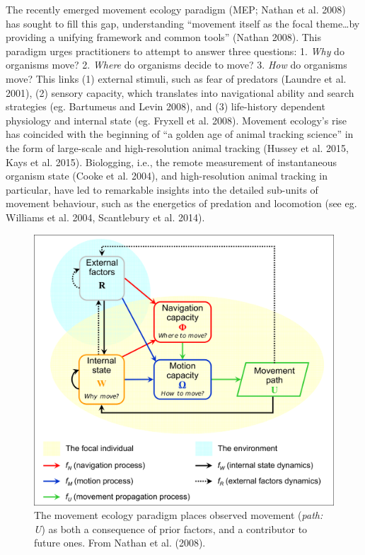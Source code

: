\documentclass[]{scrartcl}
\begin{document}
\begin{linenumbers}
The recently emerged movement ecology paradigm (MEP; Nathan et al. 2008)
has sought to fill this gap, understanding ``movement itself as the
focal theme\ldots{}by providing a unifying framework and common tools''
(Nathan 2008). This paradigm urges practitioners to attempt to answer
three questions: 1. \emph{Why} do organisms move? 2. \emph{Where} do
organisms decide to move? 3. \emph{How} do organisms move? This links
(1) external stimuli, such as fear of predators (Laundre et al. 2001),
(2) sensory capacity, which translates into navigational ability and
search strategies (eg. Bartumeus and Levin 2008), and (3) life-history
dependent physiology and internal state (eg. Fryxell et al. 2008).
Movement ecology's rise has coincided with the beginning of ``a golden
age of animal tracking science'' in the form of large-scale and
high-resolution animal tracking (Hussey et al. 2015, Kays et al. 2015).
Biologging, i.e., the remote measurement of instantaneous organism state
(Cooke et al. 2004), and high-resolution animal tracking in particular,
have led to remarkable insights into the detailed sub-units of movement
behaviour, such as the energetics of predation and locomotion (see eg.
Williams et al. 2004, Scantlebury et al. 2014).

\begin{figure}
	\centering
	\includegraphics[width=0.7\linewidth]{fig02_nathan_etal_2008}
	\caption{The movement ecology paradigm places observed movement (\textit{path: U}) as both a consequence of prior factors, and a contributor to future ones. From Nathan et al. (2008).}
	\label{fig:fig02nathanetal2008}
\end{figure}


\end{linenumbers}
\end{document}
